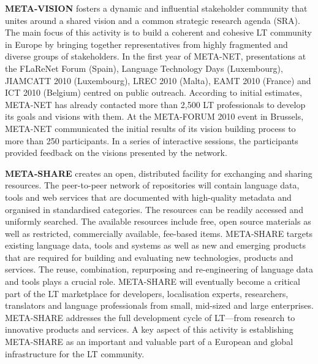 \documentclass[]{../../metanetpaper}
\begin{document}
\begin{Parallel}[c]{70mm}{70mm}
{%

\textbf{META-VISION} fosters a dynamic and influential stakeholder
community that unites around a shared vision and a common strategic
research agenda (SRA). The main focus of this activity is to build a
coherent and cohesive LT community in Europe by bringing together
representatives from highly fragmented and diverse groups of
stakeholders. In the first year of META-NET, presentations at the
FLaReNet Forum (Spain), Language Technology Days (Luxembourg),
JIAMCATT 2010 (Luxembourg), LREC 2010 (Malta), EAMT 2010 (France) and
ICT 2010 (Belgium) centred on public outreach. According to initial
estimates, META-NET has already contacted more than 2,500 LT
professionals to develop its goals and visions with them. At the
META-FORUM 2010 event in Brussels, META-NET communicated the initial
results of its vision building process to more than 250
participants. In a series of interactive sessions, the participants
provided feedback on the visions presented by the network.

\textbf{META-SHARE} creates an open, distributed facility for
exchanging and sharing resources. The peer-to-peer network of
repositories will contain language data, tools and web services that
are documented with high-quality metadata and organised in
standardised categories. The resources can be readily accessed and
uniformly searched. The available resources include free, open source
materials as well as restricted, commercially available, fee-based
items. META-SHARE targets existing language data, tools and systems as
well as new and emerging products that are required for building and
evaluating new technologies, products and services. The reuse,
combination, repurposing and re-engineering of language data and tools
plays a crucial role. META-SHARE will eventually become a critical
part of the LT marketplace for developers, localisation experts,
researchers, translators and language professionals from small,
mid-sized and large enterprises. META-SHARE addresses the full
development cycle of LT—from research to innovative products and
services. A key aspect of this activity is establishing META-SHARE as
an important and valuable part of a European and global infrastructure
for the LT community.

}
\end{Parallel}
\end{document}
